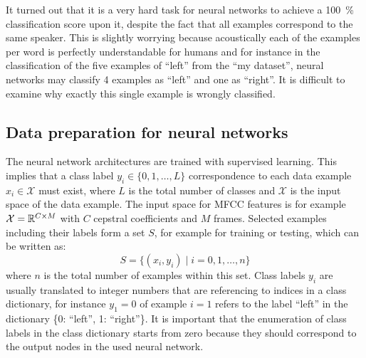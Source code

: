 \FloatBarrier
\noindent
It turned out that it is a very hard task for neural networks to achieve a \SI{100}{\percent} classification score upon it, despite the fact that all examples correspond to the same speaker.
This is slightly worrying because acoustically each of the examples per word is perfectly understandable for humans and for instance in the classification of the five examples of \enquote{left} from the \enquote{my dataset}, neural networks may classify 4 examples as \enquote{left} and one as \enquote{right}.
It is difficult to examine why exactly this single example is wrongly classified.



\subsection{Data preparation for neural networks}\label{sec:exp_data_prep}
The neural network architectures are trained with supervised learning.
This implies that a class label $y_i \in \{0, 1, \dots, L\}$ correspondence to each data example $x_i \in \mathcal{X}$ must exist, where $L$ is the total number of classes and $\mathcal{X}$ is the input space of the data example.
The input space for MFCC features is for example $\mathcal{X} = \mathbb{R}^{C \times M}$ with $C$ cepstral coefficients and $M$ frames.
Selected examples including their labels form a set $S$, for example for training or testing, which can be written as:
\begin{equation}\label{eq:exp_dataset}
  S = \{ (x_i, y_i) \mid i = 0, 1, \dots, n \}
\end{equation}
where $n$ is the total number of examples within this set.
Class labels $y_i$ are usually translated to integer numbers that are referencing to indices in a class dictionary, for instance $y_1 = 0$ of example $i=1$ refers to the label \enquote{left} in the dictionary \{0: \enquote{left}, 1: \enquote{right}\}.
It is important that the enumeration of class labels in the class dictionary starts from zero because they should correspond to the output nodes in the used neural network.

